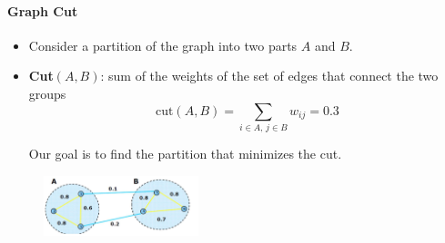 \documentclass[11pt]{article}
\begin{document}
\pagebreak

\paragraph*{Graph Cut}


\begin{itemize}
    \item Consider a partition of the graph into two parts \( A \) and \( B \).
    
    \item \textbf{Cut}\((A, B)\): sum of the weights of the set of edges that connect the two groups
    \[
        \text{cut}(A, B) = \sum_{i \in A,\, j \in B} w_{ij} = 0.3
    \]
    
    Our goal is to find the partition that minimizes the cut.

\end{itemize}

\begin{figure}[!ht]
	\centering
	\includegraphics[width=0.4\textwidth]{../imgs/gcut} %
\end{figure}
\end{document}
